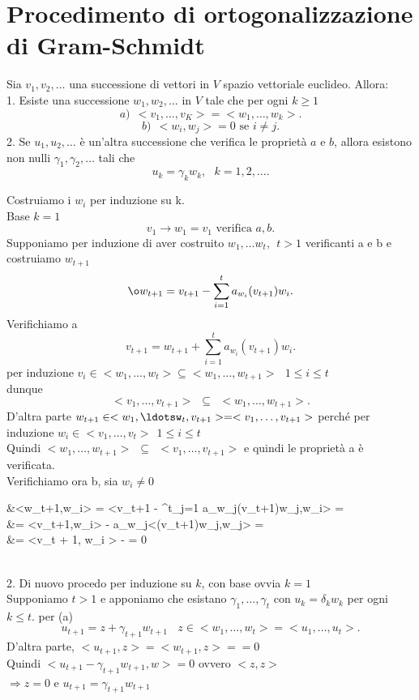 \documentclass[12px]{article}
\begin{document}
\section{Procedimento di ortogonalizzazione di Gram-Schmidt}
\begin{lemm}
Sia $v_1,v_2,\ldots$ una successione di vettori in $V$ spazio  vettoriale euclideo. Allora:\\
1. Esiste una successione $w_1,w_2,\ldots$ in $V$ tale che per ogni $k\geq 1$
\[
a) \ \ <v_1, \ldots, v_K> = <w_1,\ldots,w_k>
.\] 
\[
	b) \ \ <w_i,w_j> = 0 \text{ se } i\neq j
.\] 
2. Se $u_1,u_2,\ldots$ è un'altra successione che verifica le proprietà $a$ e $b$, allora esistono non nulli $\gamma_1,\gamma_2,\ldots$ tali che
\[
u_k = \gamma_k w_k, \ \ \ k = 1,2,\ldots
.\] 
\end{lemm}
\begin{dimo}
	Costruiamo i $w_i$ per induzione su k. \\
	Base  $k = 1$ 
	\[
		v_1 \rightarrow w_1 = v_1 \text{ verifica }a,b
	.\] 
	Supponiamo per induzione di aver costruito $w_1,\ldots w_t, \ \ t >1$ verificanti a e b e costruiamo $w_{t+1}$
	\[
		\o w_{t+1} = v_{t+1} -\sum^t_{i=1}a_{w_i}(v_{t+1})w_i
	.\] 
	Verifichiamo a
	\[
		v_{t+1} = w_{t+1} + \sum^t_{i=1}a_{w_i}(v_{t+1})w_i
	.\] 
	per induzione $v_i\in <w_1,\ldots,w_t>\subseteq <w_1,\ldots,w_{t+1}> \ \ \ 1\leq i \leq t$\\
	dunque
	\[
		<v_1,\ldots,v_{t+1}> \ \ \subseteq\ \ <w_1,\ldots,w_{t+1}>
	.\] 
	D'altra parte $w_{t+1}\in<w_1,\ldotsw_t,v_{t+1}> = <v_1,\ldots,v_{t+1}>$ perché per induzione $w_i\in <v_1,\ldots, v_t> \ \ 1\leq i\leq t$ \\
	Quindi $<w_1,\ldots,w_{t+1}>\ \ \subseteq \ \ <v_1,\ldots, v_{t+1}>$ e quindi le proprietà a è verificata. \\ 
	Verifichiamo ora b, sia $w_i \neq 0$ \\
	\begin{aligned}
		&<w_{t+1},w_i> = <v_{t+1} - \sum^t_{j=1} a_{w_j}(v_{t+1})w_j,w_i> = \\
		&= <v_{t+1},w_i> - a_{w_j}<(v_{t+1})w_j,w_j> =\\
		&= <v_{t + 1}, w_i > -  = 0
	\end{aligned}
	\newpage \ \\ 
	2. Di nuovo procedo per induzione su $k$, con base ovvia $k=1$ \\
	Supponiamo $t>1$ e apponiamo che esistano $\gamma_1,\ldots,\gamma_t$ con $u_k = \delta_kw_k$ per ogni $k\leq t$. per (a)\\ 
	\[
		u_{t+1} = z + \gamma_{t+1}w_{t+1} \ \ \ \ z\in <w_1,\ldots,w_t> = <u_1,\ldots,u_t>
	.\] 
	D'altra parte, $<u_{t+1}, z> = <w_{t+1},z>= = 0$\\
	Quindi $<u_{t+1} - \gamma_{t+1}w_{t+1},w> = 0$ ovvero $<z,z>$ \\
	$ \Rightarrow z= 0$ e $u_{t+1}=\gamma_{t+1}w_{t+1}$
\end{dimo}
\end{document}
